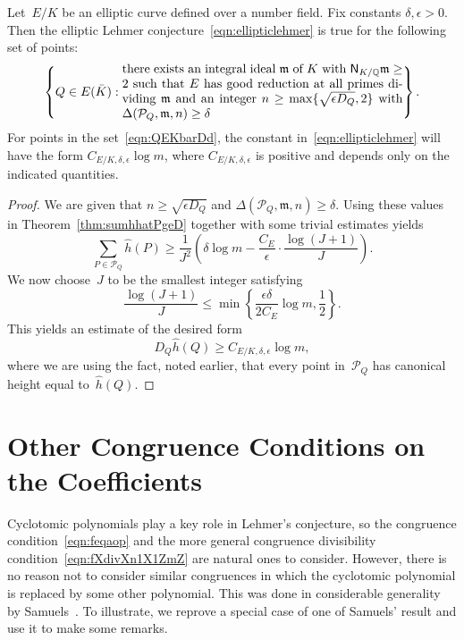 \begin{corollary}
\label{cor:ellipticlehmer}
Let~$E/K$ be an elliptic curve defined over a number field.  Fix
constants ${\delta},{\epsilon}>0$. Then the elliptic Lehmer
conjecture~\eqref{eqn:ellipticlehmer} is true for the
following set of points\textup:
\begin{equation}
  \label{eqn:QEKbarDd}
  \left\{ Q \in E({{\bar K}}) : 
   \parbox{.65\hsize}{\noindent
    there exists an integral ideal ${{\mathfrak{m}}}$ of $K$ 
    with ${{\operatorname{\mathsf{N}}}}_{K/{\mathbb{Q}}}{{\mathfrak{m}}}\ge2$ such that $E$ has
    good reduction at all primes dividing ${{\mathfrak{m}}}$ and
    an integer $n\ge\max\{\sqrt{{\epsilon} D_Q},2\}$ 
    with ${\Delta}({{\mathcal P}}_Q,{{\mathfrak{m}}},n)\ge{\delta}$
  }
  \right\}.
\end{equation}
For points in the set~\eqref{eqn:QEKbarDd}, the constant
in~\eqref{eqn:ellipticlehmer} will have the form
$C_{E/K,{\delta},{\epsilon}}\log{m}$, where $C_{E/K,{\delta},{\epsilon}}$ is positive and depends
only on the indicated quantities.
\end{corollary}
\begin{proof}
We are given that $n\ge\sqrt{{\epsilon} D_Q}$ and ${\Delta}({{\mathcal P}}_Q,{{\mathfrak{m}}},n)\ge{\delta}$.
Using these values in Theorem~\ref{thm:sumhhatPgeD} together with
some trivial estimates yields
\[
  \sum_{P\in{{\mathcal P}}_Q}{{\hat h}}(P)
  \ge \frac{1}{J^2}\left({\delta}\log m
           -\frac{C_E}{\epsilon}\cdot\frac{\log(J+1)}{J}\right).
\]
We now choose~$J$ to be the smallest integer satisfying
\[
  \frac{\log(J+1)}{J} \le \min\left\{ \frac{{\epsilon}{\delta}}{2C_E}\log m, \frac12\right\}.
\]
This yields  an estimate of the desired form
\[
  D_Q{{\hat h}}(Q) \ge C_{E/K,{\delta},{\epsilon}}\log m,
\]
where we are using the fact, noted earlier, that every point in~${{\mathcal P}}_Q$
has canonical height equal to~${{\hat h}}(Q)$.
\end{proof}

\section{Other Congruence Conditions on the Coefficients}
\label{section:coefcong}

Cyclotomic polynomials play a key role in Lehmer's conjecture, so the
congruence condition~\eqref{eqn:feqaop} and the more general
congruence divisibility condition~\eqref{eqn:fXdivXn1X1ZmZ} are
natural ones to consider. However, there is no reason not to consider
similar congruences in which the cyclotomic polynomial is replaced by
some other polynomial.  This was done in considerable generality by
Samuels~\cite{MR2313990}. To illustrate, we reprove a special
case of one of Samuels' result and use it to make some remarks.

